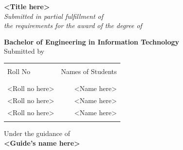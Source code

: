 \begin{titlepage}

       \begin{center}


              \Large \textbf {<Title here>}\\[0.5in]

              \small \emph{Submitted in partial fulfillment of\\
                     the requirements for the award of the degree of}
              \vspace{.2in}

              {\bf Bachelor of Engineering in Information Technology}\\[0.5in]

              \normalsize Submitted by \\
              \begin{table}[h]
                     \centering
                     \begin{tabular}{lr}\hline                         \\
                            Roll No        & Names of Students \\ \\ \hline
                            \\
                            <Roll no here> & <Name here>       \\
                            <Roll no here> & <Name here>       \\
                            <Roll no here> & <Name here>       \\ \\ \hline
                     \end{tabular}
              \end{table}

              \vspace{.1in}
              Under the guidance of\\
              {\textbf{<Guide's name here>}}\\[0.2in]

              \vfill


\end{center}
\end{titlepage}
